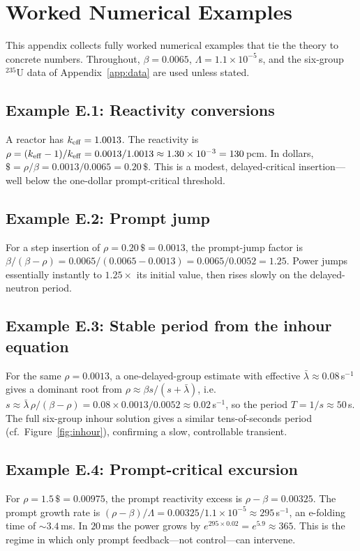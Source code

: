 \chapter{Worked Numerical Examples}
\label{app:worked}

This appendix collects fully worked numerical examples that tie the theory to
concrete numbers. Throughout, $\beta=0.0065$, $\Lambda=1.1\times10^{-5}\,$s, and
the six-group $^{235}$U data of Appendix~\ref{app:data} are used unless stated.

\section*{Example E.1: Reactivity conversions}
A reactor has $k_{\mathrm{eff}}=1.0013$. The reactivity is
$\rho=(k_{\mathrm{eff}}-1)/k_{\mathrm{eff}} = 0.0013/1.0013 \approx 1.30\times10^{-3} = 130\,$pcm. In
dollars, $\$=\rho/\beta = 0.0013/0.0065 = 0.20\,\$$. This is a modest,
delayed-critical insertion---well below the one-dollar prompt-critical threshold.

\section*{Example E.2: Prompt jump}
For a step insertion of $\rho=0.20\,\$=0.0013$, the prompt-jump factor is
$\beta/(\beta-\rho)=0.0065/(0.0065-0.0013)=0.0065/0.0052=1.25$. Power jumps
essentially instantly to $1.25\times$ its initial value, then rises slowly on the
delayed-neutron period.

\section*{Example E.3: Stable period from the inhour equation}
For the same $\rho=0.0013$, a one-delayed-group estimate with effective
$\bar\lambda\approx0.08\,$s$^{-1}$ gives a dominant root from
$\rho\approx\beta s/(s+\bar\lambda)$, i.e.\
$s\approx \bar\lambda\,\rho/(\beta-\rho)=0.08\times0.0013/0.0052\approx0.02\,$s$^{-1}$,
so the period $T=1/s\approx 50\,$s. The full six-group inhour solution gives a
similar tens-of-seconds period (cf.\ Figure~\ref{fig:inhour}), confirming a slow,
controllable transient.

\section*{Example E.4: Prompt-critical excursion}
For $\rho=1.5\,\$=0.00975$, the prompt reactivity excess is
$\rho-\beta=0.00325$. The prompt growth rate is
$(\rho-\beta)/\Lambda=0.00325/1.1\times10^{-5}\approx 295\,$s$^{-1}$, an e-folding
time of $\sim3.4\,$ms. In $20\,$ms the power grows by
$e^{295\times0.02}=e^{5.9}\approx 365$. This is the regime in which only prompt
feedback---not control---can intervene.

